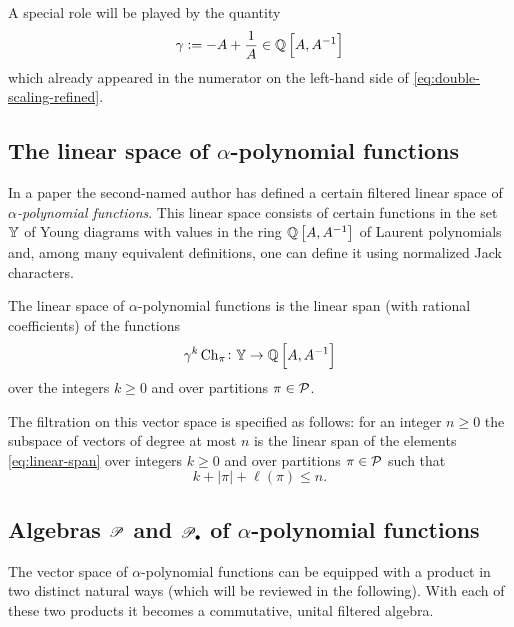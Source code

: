 \documentclass[12pt,usenames,dvipsnames,svgnames,table]{amsart}
\begin{document}
\medskip

A special role will be played by the quantity
\begin{equation}
\label{eq:gamma}
\gamma := -A +\frac{1}{A} \in \mathbb{Q}\left[A,A^{-1}\right]   
\end{equation}
which already appeared in the numerator on the left-hand side of \eqref{eq:double-scaling-refined}.

\subsection{The linear space of $\alpha$-polynomial functions}
\label{sec:polynomial}
In a paper \cite{Sniady-AsymptoticsJack} the second-named author has defined a certain filtered linear space 
of \emph{$\alpha$-po\-ly\-no\-mial functions}.
This linear space consists of certain functions in the set $\mathbb{Y}$
of Young diagrams with values in the ring $\mathbb{Q}\left[A,A^{-1}\right]$ of Laurent polynomials and, among many equivalent definitions, one can define it using normalized Jack characters.

\begin{definition}
	\label{def:polynomial-functions}
	The linear space of $\alpha$-polynomial functions is the linear span (with rational coefficients) of the functions
	\begin{equation}
	\label{eq:linear-span}
	\gamma^k \operatorname{Ch}_\pi \colon \mathbb{Y} \to \mathbb{Q}\left[A,A^{-1}\right]
	\end{equation}
	over the integers $k\geq 0$ and over partitions $\pi\in\mathcal{P}$.
	
	The filtration on this vector space is specified as follows:
	for an integer $n\geq 0$ the subspace of vectors of degree at most $n$ 
	is the linear span of the elements \eqref{eq:linear-span} 
	over integers $k\geq 0$ and over partitions $\pi\in\mathcal{P}$
	such that 
	\[ k+|\pi|+\ell(\pi)\leq n . \]
\end{definition}

\subsection{Algebras $\mathscr{P}$ and $\mathscr{P}_\bullet$ of $\alpha$-polynomial functions}
\label{sec:polynomial-disjoint}

The vector space of $\alpha$-polynomial functions can be equipped with 
a product in two distinct natural ways (which will be reviewed in the following).
With each of these two products it becomes a commutative, unital filtered algebra.
\end{document}
